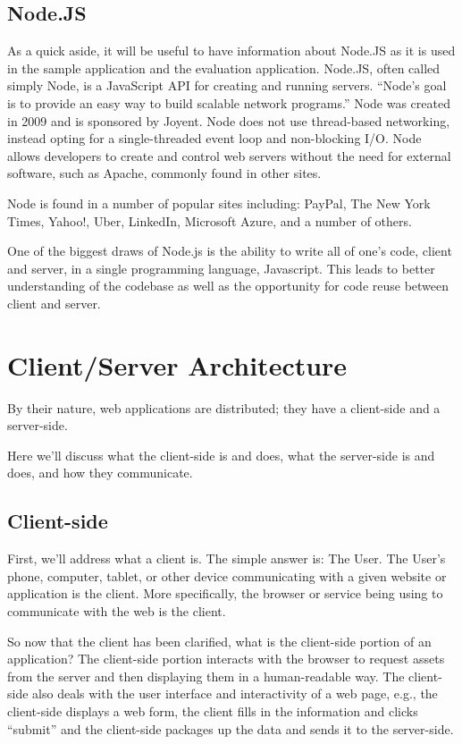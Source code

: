 \documentclass[12pt]{ucthesis}
\begin{document}
\subsection{Node.JS}
As a quick aside, it will be useful to have information about Node.JS as it is used in the sample application and the evaluation application. Node.JS, often called simply Node, is a JavaScript API for creating and running servers. ``Node's goal is to provide an easy way to build scalable network programs.'' \cite{Node} Node was created in 2009 and is sponsored by Joyent. Node does not use thread-based networking, instead opting for a single-threaded event loop and non-blocking I/O. Node allows developers to create and control web servers without the need for external software, such as Apache, commonly found in other sites.

Node is found in a number of popular sites including: PayPal, The New York Times, Yahoo!, Uber, LinkedIn, Microsoft Azure, and a number of others. \cite{Node}

One of the biggest draws of Node.js is the ability to write all of one's code, client and server, in a single programming language, Javascript. This leads to better understanding of the codebase as well as the opportunity for code reuse between client and server.

\section{Client/Server Architecture}
By their nature, web applications are distributed; they have a client-side and a server-side.

Here we'll discuss what the client-side is and does, what the server-side is and does, and how they communicate.

\subsection{Client-side}
First, we'll address what a client is. The simple answer is: The User. The User's phone, computer, tablet, or other device communicating with a given website or application is the client. More specifically, the browser or service being using to communicate with the web is the client. 

So now that the client has been clarified, what is the client-side portion of an application? The client-side portion interacts with the browser to request assets from the server and then displaying them in a human-readable way. The client-side also deals with the user interface and interactivity of a web page, e.g., the client-side displays a web form, the client fills in the information and clicks ``submit'' and the client-side packages up the data and sends it to the server-side.
\end{document}
